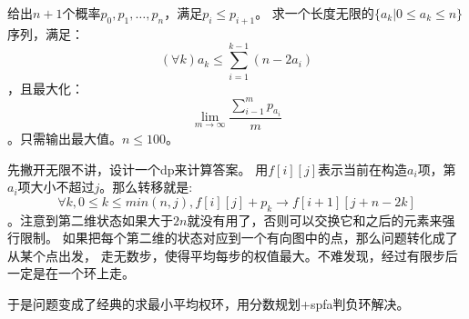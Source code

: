 \begin{prob}
	给出$n+1$个概率$p_0,p_1,\ldots,p_n$，满足$p_i \le p_{i+1}$。
	求一个长度无限的$\{a_k | 0 \le a_k \le n\}$序列，满足：
	\begin{displaymath}
		(\forall k) a_k \le \sum_{i=1}^{k-1} (n-2a_i)
	\end{displaymath}
	，且最大化：
	\begin{displaymath}
		\lim_{m \to \infty} \frac{\sum_{i-1}^m p_{a_i}}{m}
	\end{displaymath}
	。只需输出最大值。$n \le 100$。
\end{prob}

\begin{sol}
	先撇开无限不讲，设计一个dp来计算答案。
	用$f[i][j]$表示当前在构造$a_i$项，第$a_i$项大小不超过$j$。那么转移就是:
	\begin{displaymath}
		\forall k, 0 \le k \le min(n, j), f[i][j] + p_k \to f[i+1][j+n-2k]
	\end{displaymath}
	。注意到第二维状态如果大于$2n$就没有用了，否则可以交换它和之后的元素来强行限制。
	如果把每个第二维的状态对应到一个有向图中的点，那么问题转化成了从某个点出发，
	走无数步，使得平均每步的权值最大。不难发现，经过有限步后一定是在一个环上走。\par
	于是问题变成了经典的求最小平均权环，用分数规划+spfa判负环解决。
\end{sol}
